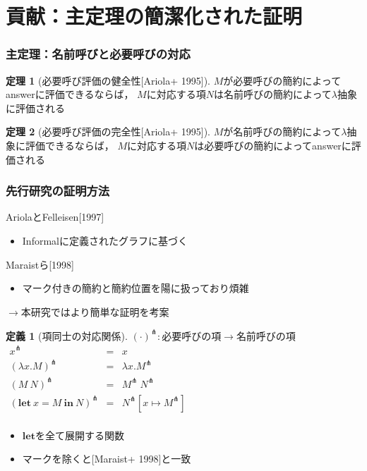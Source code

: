 \documentclass[dvipdfmx,cjk,xcolor=dvipsnames,envcountsect,notheorems,12pt]{beamer}
\theoremstyle{definition}
\newtheorem{definition}{定義}
\newtheorem{theorem}{定理}
\newcommand{\LET}[3]{\mathbf{let}~#1=#2~\mathbf{in}~#3}
\newcommand{\EXPANDLET}[1]{#1^\pitchfork}
\begin{document}
\section{貢献：主定理の簡潔化された証明}

\begin{frame}
	\frametitle{主定理：名前呼びと必要呼びの対応}
	\large
	\begin{theorem}[必要呼び評価の健全性{[Ariola+ 1995]}]
		$M$が必要呼びの簡約によってanswerに評価できるならば，
		$M$に対応する項$N$は名前呼びの簡約によって$\lambda$抽象に評価される
	\end{theorem}
	\begin{theorem}[必要呼び評価の完全性{[Ariola+ 1995]}]
		$M$が名前呼びの簡約によって$\lambda$抽象に評価できるならば，
		$M$に対応する項$N$は必要呼びの簡約によってanswerに評価される
	\end{theorem}
\end{frame}

\begin{frame}[fragile]
	\frametitle{先行研究の証明方法}
	\begin{itembox}[c]{AriolaとFelleisen[1997]}
		\begin{itemize}
			\item Informalに定義されたグラフに基づく
		\end{itemize}
	\end{itembox}
	\begin{itembox}[c]{Maraistら[1998]}
		\begin{itemize}
			\item マーク付きの簡約と簡約位置を陽に扱っており煩雑
		\end{itemize}
	\end{itembox}
	\begin{center}
		\Large
		$\rightarrow$本研究では\alert{より簡単な証明を考案}
	\end{center}
\end{frame}

\begin{frame}[fragile]
	\Large
	\begin{definition}[項同士の対応関係]
	$\EXPANDLET{(\cdot)} : \mbox{必要呼びの項} \rightarrow \mbox{名前呼びの項}$ \\
	$\begin{array}{rcl}
		\EXPANDLET{x} & = & x \\
		\EXPANDLET{(\lambda x. M)} & = & \lambda x. \EXPANDLET{M} \\
		\EXPANDLET{(M~N)} & = & \EXPANDLET{M}~\EXPANDLET{N} \\
		\EXPANDLET{(\LET{x}{M}{N})} & = & \EXPANDLET{N}[x \mapsto \EXPANDLET{M}] \\
	\end{array}$
	\end{definition}
	\begin{itemize}
		\item $\mathbf{let}$を全て展開する関数
		\item マークを除くと[Maraist+ 1998]と一致
	\end{itemize}
\end{frame}
\end{document}
